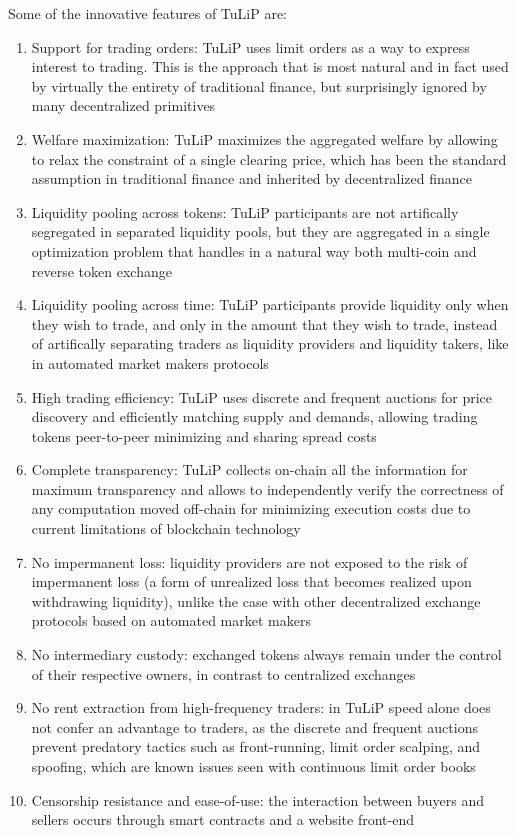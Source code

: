 \documentclass[11pt, reqno]{amsart}
\theoremstyle{definition}
\theoremstyle{remark}
\begin{document}
Some of the innovative features of TuLiP are:
\begin{enumerate}
    \item Support for trading orders:
          TuLiP uses limit orders as a way to express interest to trading. This
          is the approach that is most natural and in fact used by virtually
          the entirety of traditional finance, but surprisingly ignored by many
          decentralized primitives
    \item Welfare maximization:
          TuLiP maximizes the aggregated welfare by allowing to relax the
          constraint of a single clearing price, which has been the standard
          assumption in traditional finance and inherited by decentralized
          finance
    \item Liquidity pooling across tokens:
          TuLiP participants are not artifically segregated in separated liquidity
          pools, but they are aggregated in a single optimization problem that
          handles in a natural way both multi-coin and reverse token exchange
	\item Liquidity pooling across time:
          TuLiP participants provide liquidity only when they wish to trade, and only
          in the amount that they wish to trade, instead of artifically
          separating traders as liquidity providers and liquidity takers, like
          in automated market makers protocols
	\item High trading efficiency:
          TuLiP uses discrete and frequent auctions for price discovery and
          efficiently matching supply and demands, allowing trading tokens
          peer-to-peer minimizing and sharing spread costs
    \item Complete transparency:
          TuLiP collects on-chain all the information for maximum transparency
          and allows to independently verify the correctness of any computation
          moved off-chain for minimizing execution costs due to current limitations
          of blockchain technology
	\item No impermanent loss:
	      liquidity providers are not exposed to the risk of impermanent loss
	      (a form of unrealized loss that becomes realized upon withdrawing
	      liquidity), unlike the case with other decentralized exchange protocols
	      based on automated market makers
	\item No intermediary custody:
	      exchanged tokens always remain under the control of their respective
          owners, in contrast to centralized exchanges
	\item No rent extraction from high-frequency traders:
          in TuLiP speed alone does not confer an advantage to traders, as the
          discrete and frequent auctions prevent predatory tactics such as
          front-running, limit order scalping, and spoofing, which are known
          issues seen with continuous limit order books
    \item Censorship resistance and ease-of-use:
          the interaction between buyers and sellers occurs through smart
          contracts and a website front-end
\end{enumerate}
\end{document}
